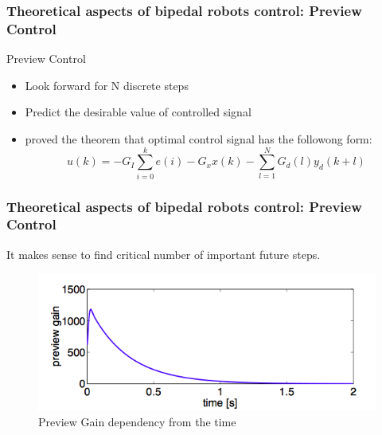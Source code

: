 \documentclass{beamer}
\begin{document}

	\begin{frame}
		\frametitle{Theoretical aspects of bipedal robots control: Preview Control}
		\begin{block}{Preview Control}
			\begin{itemize}
				\item
					 Look forward for N discrete steps
				\item
					Predict the desirable value of controlled signal
				\item
					\cite{katayama1985design} proved the theorem that optimal control signal has the followong form:
					\begin{equation}
						u(k) = -G_I \sum^{k}_{i=0} e(i) - G_xx(k) - \sum^{N}_{l=1}G_d(l)y_d(k+l)
					\end{equation}
			\end{itemize}
		\end{block}
	\end{frame}
	

	\begin{frame}
		\frametitle{Theoretical aspects of bipedal robots control: Preview Control}
		It makes sense to find critical number of important future steps.
		\begin{figure}[h!]
			\begin{minipage}[H]{\linewidth}
				\centering
				\includegraphics[width=0.7\linewidth]{presentation_images/16}
				\caption{Preview Gain dependency from the time \cite{kajita2003biped}}
			\end{minipage}
		\end{figure}
	\end{frame}
	
\end{document}
